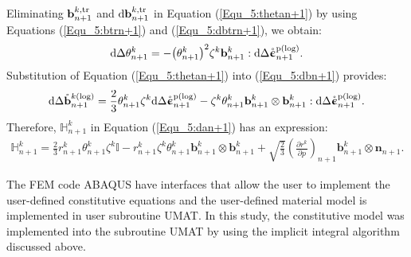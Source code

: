 Eliminating ${\mathbf{b}}_{n + 1}^{k,\rm tr}$ and ${\text{d}}{\mathbf{b}}_{n + 1}^{k,\rm tr}$ in Equation (\ref{Equ_5:thetan+1}) by using Equations (\ref{Equ_5:btrn+1}) and (\ref{Equ_5:dbtrn+1}), we obtain:
\begin{equation}
\label{Equ_5:thetan+1}
{\text{d}} \Delta \theta _{n + 1}^k =  - {\left( {\theta _{n + 1}^k} \right)^2}{\zeta ^k}{\mathbf{b}}_{n + 1}^k:{\text{d}}\Delta \mathring {\bm{\upepsilon}}_{n + 1}^{\rm p(\log) }.
\end{equation}
Substitution of Equation (\ref{Equ_5:thetan+1}) into (\ref{Equ_5:dbn+1}) provides:
\begin{equation}
\label{Equ_5:dbn+12}
\text{d} \Delta \mathring {\mathbf{b}}_{n + 1}^{k(\log) } = \frac{2}{3}\theta _{n + 1}^k{\zeta ^k}{\text{d}}\Delta \mathring {\bm{\upepsilon}}_{n + 1}^{\rm p(\log) } - {\zeta ^k}\theta _{n + 1}^k{\mathbf{b}}_{n + 1}^k \otimes {\mathbf{b}}_{n + 1}^k:{\text{d}}\Delta \mathring {\bm{\upepsilon}}_{n + 1}^{\rm p(\log) }.
\end{equation}
Therefore, $\mathbb{H}_{n + 1}^k$ in Equation (\ref{Equ_5:dan+1}) has an expression:
\begin{equation}
\begin{aligned}
\mathbb{H}_{n + 1}^k = \frac{2}{3}r_{n + 1}^k\theta _{n + 1}^k{\zeta ^k}\mathbb{I} - r_{n + 1}^k{\zeta ^k}\theta _{n + 1}^k{\mathbf{b}}_{n + 1}^k \otimes {\mathbf{b}}_{n + 1}^k + 
\sqrt {\frac{2}{3}} {\left( {\frac{{\partial {r^k}}}{{\partial p}}} \right)_{n + 1}}{\mathbf{b}}_{n + 1}^k \otimes {{\mathbf{n}}_{n + 1}}.
\end{aligned}
\end{equation}

The FEM code ABAQUS have interfaces that allow the user to implement the user-defined constitutive equations and the user-defined material model is implemented in user subroutine UMAT.
In this study, the constitutive model was implemented into the subroutine UMAT by using the implicit integral algorithm discussed above.
